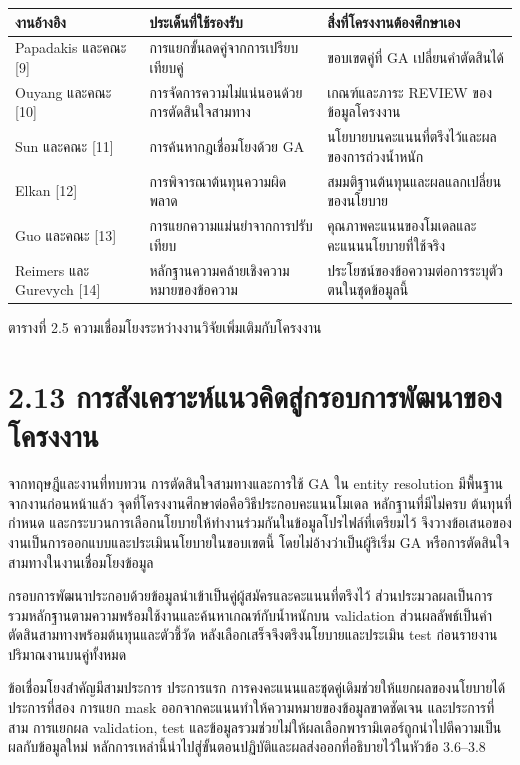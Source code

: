 \begin{center}\small
\begin{tabularx}{\linewidth}{p{2.8cm}XX}
\toprule
งานอ้างอิง & ประเด็นที่ใช้รองรับ & สิ่งที่โครงงานต้องศึกษาเอง \\
\midrule
Papadakis และคณะ [9] & การแยกขั้นลดคู่จากการเปรียบเทียบคู่ & ขอบเขตคู่ที่ GA เปลี่ยนคำตัดสินได้ \\
Ouyang และคณะ [10] & การจัดการความไม่แน่นอนด้วยการตัดสินใจสามทาง & เกณฑ์และภาระ REVIEW ของข้อมูลโครงงาน \\
Sun และคณะ [11] & การค้นหากฎเชื่อมโยงด้วย GA & นโยบายบนคะแนนที่ตรึงไว้และผลของการถ่วงน้ำหนัก \\
Elkan [12] & การพิจารณาต้นทุนความผิดพลาด & สมมติฐานต้นทุนและผลแลกเปลี่ยนของนโยบาย \\
Guo และคณะ [13] & การแยกความแม่นยำจากการปรับเทียบ & คุณภาพคะแนนของโมเดลและคะแนนนโยบายที่ใช้จริง \\
Reimers และ Gurevych [14] & หลักฐานความคล้ายเชิงความหมายของข้อความ & ประโยชน์ของข้อความต่อการระบุตัวตนในชุดข้อมูลนี้ \\
\bottomrule
\end{tabularx}
\par ตารางที่ 2.5 ความเชื่อมโยงระหว่างงานวิจัยเพิ่มเติมกับโครงงาน
\end{center}

\section*{2.13 การสังเคราะห์แนวคิดสู่กรอบการพัฒนาของโครงงาน}
จากทฤษฎีและงานที่ทบทวน การตัดสินใจสามทางและการใช้ GA ใน entity resolution มีพื้นฐานจากงานก่อนหน้าแล้ว จุดที่โครงงานศึกษาต่อคือวิธีประกอบคะแนนโมเดล หลักฐานที่มีไม่ครบ ต้นทุนที่กำหนด และกระบวนการเลือกนโยบายให้ทำงานร่วมกันในข้อมูลโปรไฟล์ที่เตรียมไว้ จึงวางข้อเสนอของงานเป็นการออกแบบและประเมินนโยบายในขอบเขตนี้ โดยไม่อ้างว่าเป็นผู้ริเริ่ม GA หรือการตัดสินใจสามทางในงานเชื่อมโยงข้อมูล

กรอบการพัฒนาประกอบด้วยข้อมูลนำเข้าเป็นคู่ผู้สมัครและคะแนนที่ตรึงไว้ ส่วนประมวลผลเป็นการรวมหลักฐานตามความพร้อมใช้งานและค้นหาเกณฑ์กับน้ำหนักบน validation ส่วนผลลัพธ์เป็นคำตัดสินสามทางพร้อมต้นทุนและตัวชี้วัด หลังเลือกเสร็จจึงตรึงนโยบายและประเมิน test ก่อนรายงานปริมาณงานบนคู่ทั้งหมด

ข้อเชื่อมโยงสำคัญมีสามประการ ประการแรก การคงคะแนนและชุดคู่เดิมช่วยให้แยกผลของนโยบายได้ ประการที่สอง การแยก mask ออกจากคะแนนทำให้ความหมายของข้อมูลขาดชัดเจน และประการที่สาม การแยกผล validation, test และข้อมูลรวมช่วยไม่ให้ผลเลือกพารามิเตอร์ถูกนำไปตีความเป็นผลกับข้อมูลใหม่ หลักการเหล่านี้นำไปสู่ขั้นตอนปฏิบัติและผลส่งออกที่อธิบายไว้ในหัวข้อ 3.6--3.8
